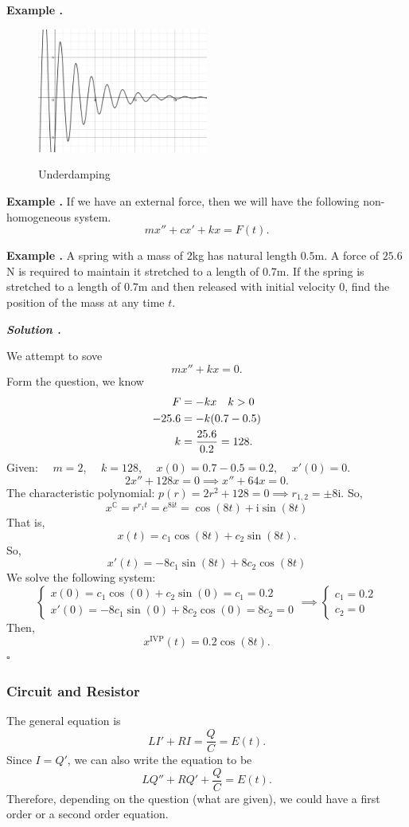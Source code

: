 \documentclass[12pt, a4paper]{article}
\newcounter{index}[subsection]
\newenvironment*{eg}{\begin{framed}\par\noindent\textbf{Example \thesubsection.\stepcounter{index}\theindex}}{\par\end{framed}}
\newcounter{nprf}[subsection]
\newenvironment*{sol}{\par\indent\textbf{\textit{Solution \stepcounter{nprf}\thenprf.}}\par}{\hfill{$\square$}\par}
\def\C{{\mathbb{C}}}
\def\i{{\mathrm{i}}}
\begin{document}
\begin{eg}
	\begin{figure}[H]
		\centering
		\includegraphics[width=0.5\textwidth]{fig/underdamping}\label{underdamping}
		\caption{Underdamping}
	\end{figure}
\end{eg}
\begin{eg}
	If we have an external force, then we will have the following non-homogeneous system. \[mx''+cx'+kx=F(t).\]
\end{eg}
\begin{eg}
	A spring with a mass of $2$kg has natural length $0.5$m. A force of $25.6$N is required to maintain it stretched to a length of $0.7$m. If the spring is stretched to a length of $0.7$m and then released with initial velocity $0$, find the position of the mass at any time $t$.
	\begin{sol}
		We attempt to sove \[mx''+kx=0.\] Form the question, we know \begin{align*}F&=-kx\quad k>0\\-25.6&=-k\qty(0.7-0.5)\\k&=\dfrac{25.6}{0.2}=128.\end{align*} Given: $\quad m=2$, $\quad k=128$, $\quad x(0)=0.7-0.5=0.2$, $\quad x'(0)=0$. \[2x''+128x=0\implies x''+64x=0.\] The characteristic polynomial: $p(r)=2r^2+128=0\implies r_{1,2}=\pm8\i$. So, \[x^\C=r^{r_1t}=e^{8\i t}=\cos(8t)+\i\sin(8t)\] That is, \[x(t)=c_1\cos(8t)+c_2\sin(8t).\] So, \[x'(t)=-8c_1\sin(8t)+8c_2\cos(8t)\] We solve the following system: \[\begin{cases}x(0)=c_1\cos(0)+c_2\sin(0)=c_1=0.2\\x'(0)=-8c_1\sin(0)+8c_2\cos(0)=8c_2=0\end{cases}\implies\begin{cases}c_1=0.2\\c_2=0\end{cases}\] Then, \[x^\text{IVP}(t)=0.2\cos(8t).\]
	\end{sol}	
\end{eg}

\subsubsection{Circuit and Resistor}
The general equation is \[LI'+RI=\dfrac{Q}{C}=E(t).\] Since $I=Q'$, we can also write the equation to be \[LQ''+RQ'+\dfrac{Q}{C}=E(t).\] Therefore, depending on the question (what are given), we could have a first order or a second order equation. 
\end{document}
